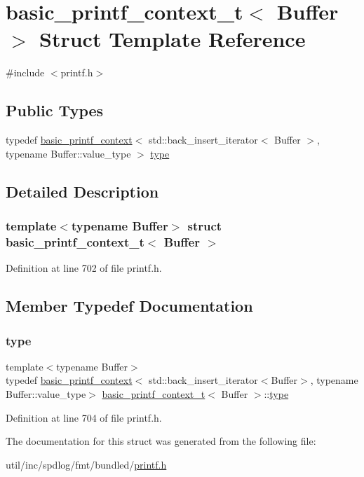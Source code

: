 \hypertarget{structbasic__printf__context__t}{}\section{basic\+\_\+printf\+\_\+context\+\_\+t$<$ Buffer $>$ Struct Template Reference}
\label{structbasic__printf__context__t}


{\ttfamily \#include $<$printf.\+h$>$}

\subsection*{Public Types}
\begin{DoxyCompactItemize}
\item 
typedef \hyperlink{classbasic__printf__context}{basic\+\_\+printf\+\_\+context}$<$ std\+::back\+\_\+insert\+\_\+iterator$<$ Buffer $>$, typename Buffer\+::value\+\_\+type $>$ \hyperlink{structbasic__printf__context__t_ad1964bfc7ecfedc8173bb26a4f62e438}{type}
\end{DoxyCompactItemize}


\subsection{Detailed Description}
\subsubsection*{template$<$typename Buffer$>$\newline
struct basic\+\_\+printf\+\_\+context\+\_\+t$<$ Buffer $>$}



Definition at line 702 of file printf.\+h.



\subsection{Member Typedef Documentation}
\mbox{\label{structbasic__printf__context__t_ad1964bfc7ecfedc8173bb26a4f62e438}} 
\subsubsection{\texorpdfstring{type}{type}}
{\footnotesize\ttfamily template$<$typename Buffer$>$ \\
typedef \hyperlink{classbasic__printf__context}{basic\+\_\+printf\+\_\+context}$<$ std\+::back\+\_\+insert\+\_\+iterator$<$Buffer$>$, typename Buffer\+::value\+\_\+type$>$ \hyperlink{structbasic__printf__context__t}{basic\+\_\+printf\+\_\+context\+\_\+t}$<$ Buffer $>$\+::\hyperlink{structbasic__printf__context__t_ad1964bfc7ecfedc8173bb26a4f62e438}{type}}



Definition at line 704 of file printf.\+h.



The documentation for this struct was generated from the following file\+:\begin{DoxyCompactItemize}
\item 
util/inc/spdlog/fmt/bundled/\hyperlink{printf_8h}{printf.\+h}\end{DoxyCompactItemize}
